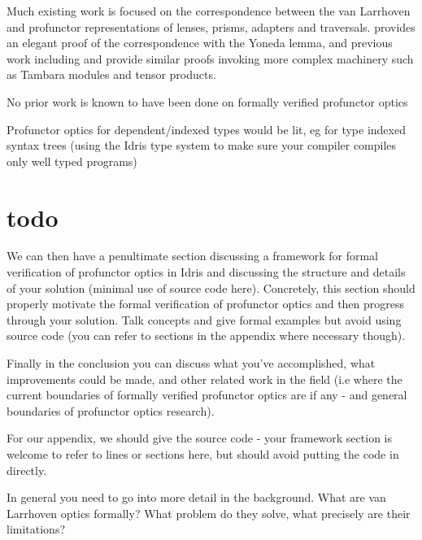 \documentclass[]{report}
\begin{document}
Much existing work is focused on the correspondence between the van Larrhoven and profunctor representations of lenses, prisms, adapters and traversals. \cite{boisseau2018yoneda} provides an elegant proof of the correspondence with the Yoneda lemma, and previous work including \cite{pickering2017profunctor} and \cite{milewski2017profunctor} provide similar proofs invoking more complex machinery such as Tambara modules and tensor products.

No prior work is known to have been done on formally verified profunctor optics

Profunctor optics for dependent/indexed types would be lit, eg for type indexed syntax trees (using the Idris type system to make sure your compiler compiles only well typed programs)

\section{todo}

We can then have a penultimate section discussing a framework for formal verification of profunctor optics in Idris and discussing the structure and details of your solution (minimal use of source code here). Concretely, this section should properly motivate the formal verification of profunctor optics and then progress through your solution. Talk concepts and give formal examples but avoid using source code (you can refer to sections in the appendix where necessary though).

Finally in the conclusion you can discuss what you've accomplished, what improvements could be made, and other related work in the field (i.e where the current boundaries of formally verified profunctor optics are if any - and general boundaries of profunctor optics research).

For our appendix, we should give the source code - your framework section is welcome to refer to lines or sections here, but should avoid putting the code in directly.

In general you need to go into more detail in the background. What are van Larrhoven optics formally? What problem do they solve, what precisely are their limitations?

\printbibliography
\end{document}
